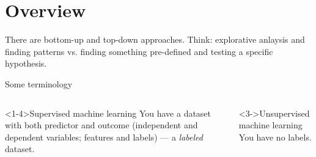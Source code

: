 \section{Overview}

\begin{frame}[standout]
There are bottom-up and top-down approaches. Think: explorative anlaysis and finding patterns vs. finding something pre-defined and testing a specific hypothesis.
\end{frame}


%









\begin{frame}{Some terminology }
\begin{columns}[t]

\begin{block}<1-4>{Supervised machine learning}
  You have a dataset with both predictor and outcome (independent and dependent variables; features and labels) --- a \emph{labeled} dataset.
\end{block}


\begin{block}<3->{Unsupervised machine learning}
  You have no labels. \\
\end{block}

\end{columns}

\end{frame}


